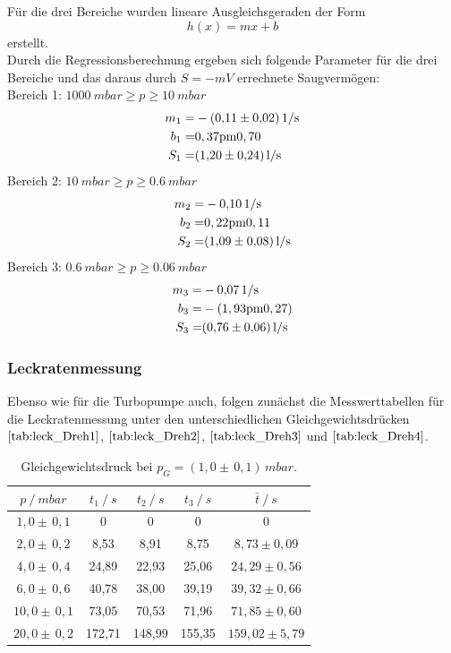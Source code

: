 Für die drei Bereiche wurden lineare Ausgleichsgeraden der Form
\begin{equation}
	h(x)=mx+b
\end{equation}
erstellt.\\
Durch die Regressionsberechnung ergeben sich folgende Parameter für die drei Bereiche und das daraus durch $S=-mV$ errechnete Saugvermögen:\\
Bereich 1: $\SI{1000}{mbar} \geq p \geq \SI{10}{mbar}$\\
\begin{align*}
	m_1=& -\SI{0,11 \pm 0,02}{1/s}\\
	b_1=& \si{0,37 \pm 0,70}\\
	S_1=& \SI{1,20 \pm 0,24}{l/s}
\end{align*}
Bereich 2: $\SI{10}{mbar} \geq p \geq \SI{0,6}{mbar}$\\
\begin{align*}
	m_2=& -\SI{0,10 \pm 0,00}{1/s}\\
	b_2=& \si{0,22 \pm 0,11}\\
	S_2=& \SI{1,09 \pm 0,08}{l/s}
\end{align*}
Bereich 3: $\SI{0,6}{mbar} \geq p \geq \SI{0,06}{mbar}$\\
\begin{align*}
	m_3=& -\SI{0,07 \pm 0,00}{1/s}\\
	b_3=& -\si{(1,93 \pm 0,27)}\\
	S_3=& \SI{0,76 \pm 0,06}{l/s}
\end{align*}

\subsubsection{Leckratenmessung}
Ebenso wie für die Turbopumpe auch, folgen zunächst die Messwerttabellen für die Leckratenmessung
unter den unterschiedlichen Gleichgewichtsdrücken $\ref{tab:leck_Dreh1}$, $\ref{tab:leck_Dreh2}$, $\ref{tab:leck_Dreh3}$ und $\ref{tab:leck_Dreh4}$.
\begin{table}[H]
\centering
\begin{tabular}{c|c|c|c|c}
	{$p \:/\: \si{mbar}$} & {$t_1 \:/\: \si{s} $} & {$t_2 \:/\: \si{s} $} & {$t_3 \:/\: \si{s} $} & {$\bar{t} \:/\: \si{s}$}\\
\midrule
$1,0 \pm \, 0,1$ &0 &0 &0 &0\\
$2,0 \pm \, 0,2$ &   8,53 &  8,91 &  8,75 & $8,73 \pm 0,09$\\
$4,0 \pm \, 0,4$ &   24,89  &  22,93 &  25,06 & $24,29 \pm 0,56 $\\
$6,0 \pm \, 0,6$ &   40,78 &  38,00 &  39,19 & $39,32 \pm 0,66 $\\
$10,0 \pm \, 0,1$ &   73,05 &  70,53 &  71,96 & $71,85 \pm 0,60 $\\
$20,0 \pm \, 0,2$ &   172,71 &  148,99 &  155,35 & $159,02 \pm 5,79 $\\
\end{tabular}
\caption{Gleichgewichtsdruck bei $p_G=(1,0 \pm \, 0,1)  \, \si{mbar}$.}
\label{tab:leck_Dreh1}
\end{table}

